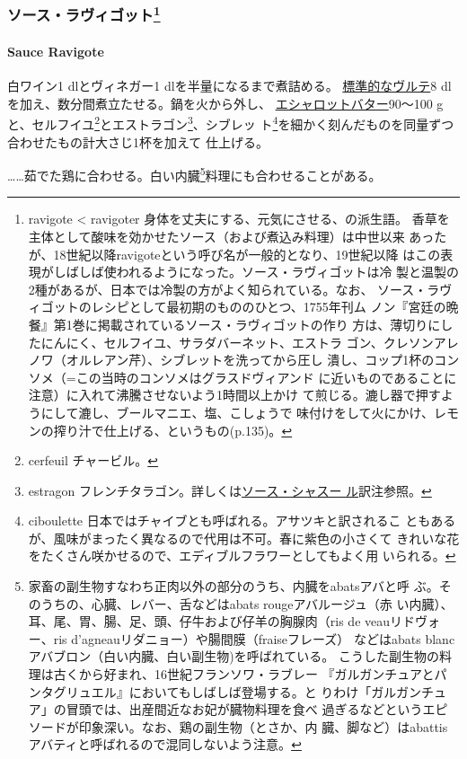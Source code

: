 \begin{recette}
{\subsubsection[ソース・ラヴィゴット]{\texorpdfstring{ソース・ラヴィゴット\footnote{ravigote
  \textless{} ravigoter 身体を丈夫にする、元気にさせる、の派生語。
  香草を主体として酸味を効かせたソース（および煮込み料理）は中世以来
  あったが、18世紀以降ravigoteという呼び名が一般的となり、19世紀以降
  はこの表現がしばしば使われるようになった。ソース・ラヴィゴットは冷
  製と温製の2種があるが、日本では冷製の方がよく知られている。なお、
  ソース・ラヴィゴットのレシピとして最初期のもののひとつ、1755年刊ム
  ノン『宮廷の晩餐』第1巻に掲載されているソース・ラヴィゴットの作り
  方は、薄切りにしたにんにく、セルフイユ、サラダバーネット、エストラ
  ゴン、クレソンアレノワ（オルレアン芹）、シブレットを洗ってから圧し
  潰し、コップ1杯のコンソメ（=この当時のコンソメはグラスドヴィアンド
  に近いものであることに注意）に入れて沸騰させないよう1時間以上かけ
  て煎じる。漉し器で押すようにして漉し、ブールマニエ、塩、こしょうで
  味付けをして火にかけ、レモンの搾り汁で仕上げる、というもの(p.135)。}}{ソース・ラヴィゴット}}\label{ux30bdux30fcux30b9ux30e9ux30f4ux30a3ux30b4ux30c3ux30c8114}}

\hypertarget{sauce-ravigote}{%
\paragraph{Sauce Ravigote}\label{sauce-ravigote}}


白ワイン1\undemi{} dlとヴィネガー1\undemi{} dlを半量になるまで煮詰める。
\protect\hyperlink{veloute}{標準的なヴルテ}8
dlを加え、数分間煮立たせる。鍋を火から外し、
\protect\hyperlink{}{エシャロットバター}90〜100
gと、セルフイユ\footnote{cerfeuil チャービル。}とエストラゴン\footnote{estragon
  フレンチタラゴン。詳しくは\protect\hyperlink{sauce-chasseur}{ソース・シャスー
  ル}訳注参照。}、シブレッ ト\footnote{ciboulette
  日本ではチャイブとも呼ばれる。アサツキと訳されるこ
  ともあるが、風味がまったく異なるので代用は不可。春に紫色の小さくて
  きれいな花をたくさん咲かせるので、エディブルフラワーとしてもよく用
  いられる。}を細かく刻んだものを同量ずつ合わせたもの計大さじ1\undemi{}杯を加えて
仕上げる。

\ldots{}\ldots{}茹でた鶏に合わせる。白い内臓\footnote{家畜の副生物すなわち正肉以外の部分のうち、内臓をabatsアバと呼
  ぶ。そのうちの、心臓、レバー、舌などはabats rougeアバルージュ（赤
  い内臓）、耳、尾、胃、腸、足、頭、仔牛および仔羊の胸腺肉（ris de
  veauリドヴォー、ris d'agneauリダニョー）や腸間膜（fraiseフレーズ）
  などはabats blancアバブロン（白い内臓、白い副生物)を呼ばれている。
  こうした副生物の料理は古くから好まれ、16世紀フランソワ・ラブレー
  『ガルガンチュアとパンタグリュエル』においてもしばしば登場する。と
  りわけ「ガルガンチュア」の冒頭では、出産間近なお妃が臓物料理を食べ
  過ぎるなどというエピソードが印象深い。なお、鶏の副生物（とさか、内
  臓、脚など）はabattisアバティと呼ばれるので混同しないよう注意。}料理にも合わせることがある。


\end{recette}
